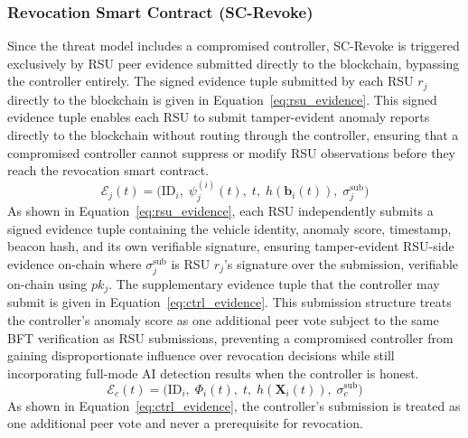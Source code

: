 \documentclass[12pt, a4paper]{report}
\begin{document}
\subsubsection{Revocation Smart Contract (SC-Revoke)}

Since the threat model includes a compromised controller, SC-Revoke
is triggered exclusively by RSU peer evidence submitted directly to
the blockchain, bypassing the controller entirely. The signed evidence
tuple submitted by each RSU $r_j$ directly to the blockchain is given
in Equation~\ref{eq:rsu_evidence}.
\newline
\newline
This signed evidence tuple enables each RSU to submit tamper-evident
anomaly reports directly to the blockchain without routing through
the controller, ensuring that a compromised controller cannot
suppress or modify RSU observations before they reach the
revocation smart contract.
\begin{equation}
  \mathcal{E}_j(t) = \bigl(\mathrm{ID}_i,\;
    \psi_j^{(i)}(t),\; t,\; h(\mathbf{b}_i(t)),\;
    \sigma_j^{\mathrm{sub}}\bigr)
  \label{eq:rsu_evidence}
\end{equation}
As shown in
Equation~\ref{eq:rsu_evidence}, each RSU independently submits a
signed evidence tuple containing the vehicle identity, anomaly score,
timestamp, beacon hash, and its own verifiable signature, ensuring
tamper-evident RSU-side evidence on-chain where $\sigma_j^{\mathrm{sub}}$ is RSU $r_j$'s signature over the
submission, verifiable on-chain using $pk_j$. The supplementary evidence
tuple that the controller may submit is given in
Equation~\ref{eq:ctrl_evidence}.
\newline
\newline
This submission structure treats the controller's anomaly score as
one additional peer vote subject to the same BFT verification as
RSU submissions, preventing a compromised controller from gaining
disproportionate influence over revocation decisions while still
incorporating full-mode AI detection results when the controller
is honest.
\begin{equation}
  \mathcal{E}_c(t) = \bigl(\mathrm{ID}_i,\;
    \Phi_i(t),\; t,\; h(\mathbf{X}_i(t)),\;
    \sigma_c^{\mathrm{sub}}\bigr)
  \label{eq:ctrl_evidence}
\end{equation}
As shown in Equation~\ref{eq:ctrl_evidence}, the controller's
submission is treated as one additional peer vote and never a
prerequisite for revocation.
\newline
\newline
\end{document}

